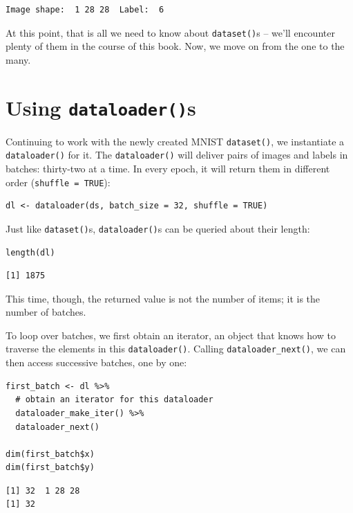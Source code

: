 \documentclass[
  letterpaper,
]{krantz}
\begin{document}
\begin{verbatim}
Image shape:  1 28 28  Label:  6 
\end{verbatim}

At this point, that is all we need to know about \texttt{dataset()}s --
we'll encounter plenty of them in the course of this book. Now, we move
on from the one to the many.

\hypertarget{using-dataloaders}{%
\section{\texorpdfstring{Using
\texttt{dataloader()}s}{Using dataloader()s}}\label{using-dataloaders}}

Continuing to work with the newly created MNIST \texttt{dataset()}, we
instantiate a \texttt{dataloader()} for it. The \texttt{dataloader()}
will deliver pairs of images and labels in batches: thirty-two at a
time. In every epoch, it will return them in different order
(\texttt{shuffle\ =\ TRUE}):

\begin{verbatim}
dl <- dataloader(ds, batch_size = 32, shuffle = TRUE)
\end{verbatim}

Just like \texttt{dataset()}s, \texttt{dataloader()}s can be queried
about their length:

\begin{verbatim}
length(dl)
\end{verbatim}

\begin{verbatim}
[1] 1875
\end{verbatim}

This time, though, the returned value is not the number of items; it is
the number of batches.

To loop over batches, we first obtain an iterator, an object that knows
how to traverse the elements in this \texttt{dataloader()}. Calling
\texttt{dataloader\_next()}, we can then access successive batches, one
by one:

\begin{verbatim}
first_batch <- dl %>%
  # obtain an iterator for this dataloader
  dataloader_make_iter() %>% 
  dataloader_next()

dim(first_batch$x)
dim(first_batch$y)
\end{verbatim}

\begin{verbatim}
[1] 32  1 28 28
[1] 32
\end{verbatim}
\end{document}
